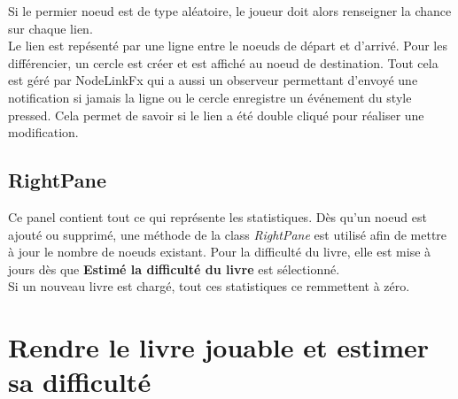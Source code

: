 			Si le permier noeud est de type aléatoire, le joueur doit alors renseigner la chance sur chaque lien.\\

			Le lien est repésenté par une ligne entre le noeuds de départ et d'arrivé. Pour les différencier, un cercle est créer et est affiché au noeud de destination. Tout cela est géré par NodeLinkFx qui a aussi un observeur permettant d'envoyé une notification si jamais la ligne ou le cercle enregistre un événement du style pressed. Cela permet de savoir si le lien a été double cliqué pour réaliser une modification.\\

		\subsection{RightPane}

		Ce panel contient tout ce qui représente les statistiques. Dès qu'un noeud est ajouté ou supprimé, une méthode de la class \textit{RightPane} est utilisé afin de mettre à jour le nombre de noeuds existant. Pour la difficulté du livre, elle est mise à jours dès que \textbf{Estimé la difficulté du livre} est sélectionné.\\
		Si un nouveau livre est chargé, tout ces statistiques ce remmettent à zéro.



	\section{Rendre le livre jouable et estimer sa difficulté}\label{Jeu}
